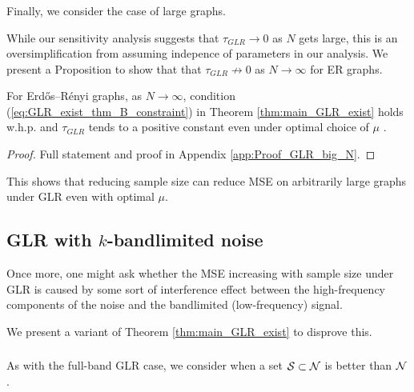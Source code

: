 {\subsubsection{}
Finally, we consider the case of large graphs.{\color{black} While our sensitivity analysis suggests that $\tau_{GLR} \to 0$ as $N$ gets large, this is an oversimplification from assuming indepence of parameters in our analysis. We present a Proposition to show that that $\tau_{GLR} \not\to 0$ as $N \to \infty$ for ER graphs.
\begin{propn}
\label{propn:GLR_big_N}
For Erdős–Rényi graphs, as $N \to \infty$, condition (\ref{eq:GLR_exist_thm_B_constraint}) in Theorem \ref{thm:main_GLR_exist} holds w.h.p. and $\tau_{GLR}$ tends to a positive constant even under optimal choice of $\mu$ \cite{chen2017GLRbias}.
\end{propn}
\begin{proof}
    Full statement and proof in Appendix 
 \ref{app:Proof_GLR_big_N}.
\end{proof}
}
{\color{black} This shows that reducing sample size can reduce MSE on arbitrarily large graphs under GLR even with optimal $\mu$. 
}

\subsection{GLR with $k$-bandlimited noise}
\label{sec:GLR_bandlimited}
Once more, one might ask whether the MSE increasing with sample size under GLR is caused by some sort of interference effect between the high-frequency components of the noise and the bandlimited (low-frequency) signal. {\color{black} We present a variant of Theorem \ref{thm:main_GLR_exist} to disprove this.

\subsubsection{} As with the full-band GLR case, we consider when a set $\mathcal{S} \subset \mathcal{N}$ is better than $\mathcal{N}$.
}}
